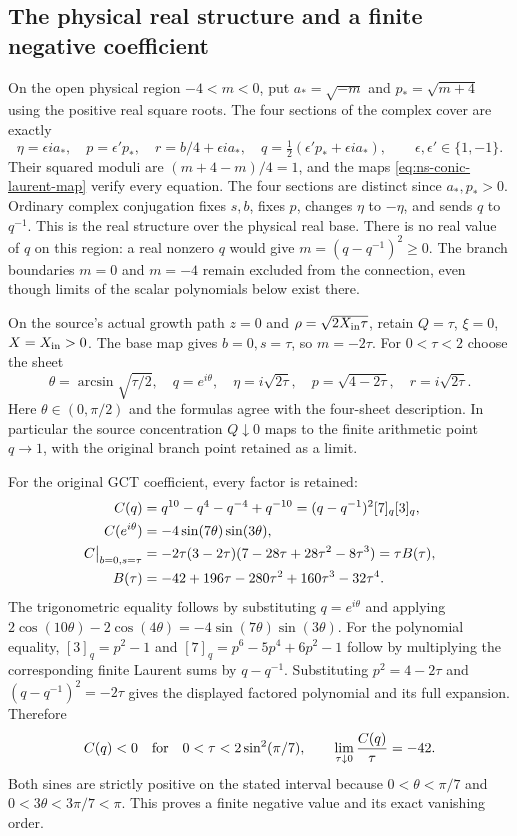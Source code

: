 \subsection{The physical real structure and a finite negative coefficient}
On the open physical region $-4<m<0$, put $a_*=\sqrt{-m}$ and
$p_*=\sqrt{m+4}$ using the positive real square roots.
The four sections of the complex cover are exactly
\[
 \eta=\epsilon i a_*,\quad p=\epsilon' p_*,\quad
 r=b/4+\epsilon i a_*,\quad
 q=\tfrac12(\epsilon'p_*+\epsilon i a_*),\qquad
 \epsilon,\epsilon'\in\{1,-1\}.
\]
Their squared moduli are $(m+4-m)/4=1$, and the maps
\eqref{eq:ns-conic-laurent-map} verify every equation. The four
sections are distinct since $a_*,p_*>0$. Ordinary complex conjugation
fixes $s,b$, fixes $p$, changes $\eta$ to $-\eta$, and sends $q$ to
$q^{-1}$. This is the real structure over the physical real base.
There is no real value of $q$ on this region: a real nonzero $q$ would
give $m=(q-q^{-1})^2\geq0$. The branch boundaries $m=0$ and $m=-4$
remain excluded from the connection, even though limits of the scalar
polynomials below exist there.

On the source's actual growth path $z=0$ and
$\rho=\sqrt{2X_{\rm in}\tau}$, retain $Q=\tau$, $\xi=0$,
$X=X_{\rm in}>0$. The base map gives $b=0,s=\tau$, so
$m=-2\tau$. For $0<\tau<2$ choose the sheet
\begin{equation}\label{eq:ns-unit-circle-growth-map}
 \theta=\arcsin\sqrt{\tau/2},\quad
 q=e^{i\theta},\quad \eta=i\sqrt{2\tau},\quad
 p=\sqrt{4-2\tau},\quad r=i\sqrt{2\tau}.
\end{equation}
Here $\theta\in(0,\pi/2)$ and the formulas agree with the four-sheet
description. In particular the source concentration $Q\downarrow0$
maps to the finite arithmetic point $q\to1$, with the original branch
point retained as a limit.

For the original GCT coefficient, every factor is retained:
\begin{align}
 C(q)&=q^{10}-q^4-q^{-4}+q^{-10}
       =(q-q^{-1})^2[7]_q[3]_q,\notag\\
 C(e^{i\theta})&=-4\sin(7\theta)\sin(3\theta),\notag\\
 C\big|_{b=0,s=\tau}
 &=-2\tau(3-2\tau)(7-28\tau+28\tau^2-8\tau^3)
   =\tau B(\tau),\label{eq:ns-finite-negative-polynomial}\\
 B(\tau)&=-42+196\tau-280\tau^2+160\tau^3-32\tau^4.
       \notag
\end{align}
The trigonometric equality follows by substituting $q=e^{i\theta}$
and applying $2\cos(10\theta)-2\cos(4\theta)
=-4\sin(7\theta)\sin(3\theta)$. For the polynomial equality,
$[3]_q=p^2-1$ and $[7]_q=p^6-5p^4+6p^2-1$ follow by multiplying
the corresponding finite Laurent sums by $q-q^{-1}$. Substituting
$p^2=4-2\tau$ and $(q-q^{-1})^2=-2\tau$ gives the displayed
factored polynomial and its full expansion. Therefore
\[
 C(q)<0\quad\hbox{for}\quad
 0<\tau<2\sin^2(\pi/7),\qquad
 \lim_{\tau\downarrow0}\frac{C(q)}\tau=-42.
\]
Both sines are strictly positive on the stated interval because
$0<\theta<\pi/7$ and $0<3\theta<3\pi/7<\pi$.
This proves a finite negative value and its exact vanishing order.

